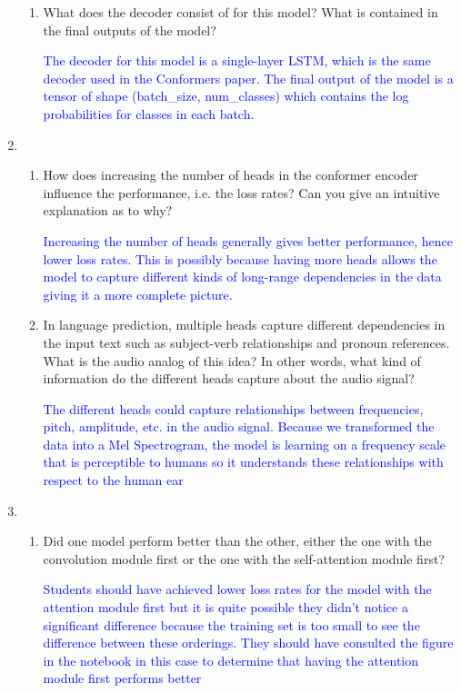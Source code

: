 \documentclass{article}
\begin{document}
\begin{enumerate}[label=(\alph*)]
\begin{enumerate}[label=(\roman*)]
    \item What does the decoder consist of for this model? What is contained in the final outputs of the model?

    \textcolor{blue}{The decoder for this model is a single-layer LSTM, which is the same decoder used in the Conformers paper. The final output of the model is a tensor of shape (batch\_size, num\_classes) which contains the log probabilities for classes in each batch.}
    
\end{enumerate}
\item\mbox{}\\ 
\begin{enumerate}[label=(\roman*)]
    \item How does increasing the number of heads in the conformer encoder influence the performance, i.e. the loss rates? Can you give an intuitive explanation as to why?

    \textcolor{blue}{Increasing the number of heads generally gives better performance, hence 
 lower loss rates. This is possibly because having more heads allows the model to capture different kinds of long-range dependencies in the data giving it a more complete picture.}
    
    \item In language prediction, multiple heads capture different dependencies in the input text such as subject-verb relationships and pronoun references. What is the audio analog of this idea? In other words, what kind of information do the different heads capture about the audio signal?

    \textcolor{blue}{The different heads could capture relationships between frequencies, pitch, amplitude, etc. in the audio signal. Because we transformed the data into a Mel Spectrogram, the model is learning on a frequency scale that is perceptible to humans so it understands these relationships with respect to the human ear}
    
\end{enumerate}
\item\mbox{}\\
\begin{enumerate}[label=(\roman*)]
    \item Did one model perform better than the other, either the one with the convolution module first or the one with the self-attention module first?

    \textcolor{blue}{Students should have achieved lower loss rates for the model with the attention module first but it is quite possible they didn't notice a significant difference because the training set is too small to see the difference between these orderings. They should have consulted the figure in the notebook in this case to determine that having the attention module first performs better}
    

\end{enumerate}
\end{enumerate}
\end{document}
